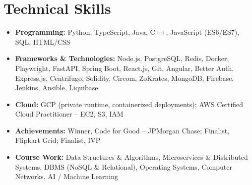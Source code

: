 \documentclass[a4paper,11pt]{article}
\newcommand{\resumeItem}[2]{
  \item{\textbf{#1}{\hspace{0.5mm}#2 \vspace{-0.5mm}}}
}
\newcommand{\resumeSubItem}[2]{\resumeItem{#1}{#2}\vspace{-7pt}}
\newcommand{\resumeHeadingSkillStart}{\begin{itemize}[leftmargin=*,itemsep=0.6mm, rightmargin=2ex]}
\newcommand{\resumeHeadingSkillEnd}{\end{itemize}\vspace{-2mm}}
\begin{document}
\section{\textbf{Technical Skills}}
\vspace{-0.4mm}
\resumeHeadingSkillStart
  \resumeSubItem{Programming: }
    {Python, TypeScript, Java, C++, JavaScript (ES6/ES7), SQL, HTML/CSS}
  \resumeSubItem{Frameworks \& Technologies: }
    {Node.js, PostgreSQL, Redis, Docker, Playwright, FastAPI, Spring Boot, React.js, Git, Angular, Better Auth, Express.js, Centrifugo, Solidity, Circom, ZoKrates, MongoDB, Firebase, Jenkins, Ansible, Liquibase}
  \resumeSubItem{Cloud: }
  {GCP (private runtime, containerized deployments); AWS Certified Cloud Practitioner -- EC2, S3, IAM}
  \resumeSubItem{Achievements: }
    {Winner, Code for Good -- JPMorgan Chase; Finalist, Flipkart Grid; Finalist, IVP}
  \resumeSubItem{Course Work: }
    {Data Structures \& Algorithms, Microservices \& Distributed Systems, DBMS (NoSQL \& Relational), Operating Systems, Computer Networks, AI / Machine Learning}
\resumeHeadingSkillEnd
\end{document}
